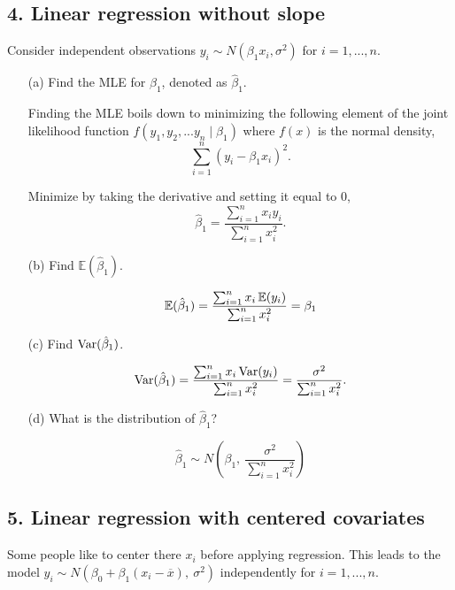 \documentclass{tufte-book}
\begin{document}
\subsection{4. Linear regression without slope} Consider independent observations $y_i \sim N(\beta_1x_i, \sigma^2)$ for $i=1,...,n$.

\begin{enumerate}

\item[(a)] Find the MLE for $\beta_1$, denoted as $\hat{\beta}_1$.

Finding the MLE boils down to minimizing the following element of the joint likelihood function $f(y_1,y_2,...y_n\mid \beta_1)$ where $f(x)$ is the normal density,
\[ \sum_{i=1}^n(y_i-\beta_1x_i)^2. \]

Minimize by taking the derivative and setting it equal to $0$,
\[ \hat{\beta}_1 = \frac{\sum_{i=1}^n x_iy_i}{\sum_{i=1}^nx_i^2}. \]

\item[(b)] Find $\mathbb{E}(\hat{\beta}_1)$.

\[ \operatorname{\mathbb{E}}(\hat{\beta}_1) = \frac{\sum_{i=1}^n x_i\operatorname{\mathbb{E}}(y_i)}{\sum_{i=1}^nx_i^2} = \beta_1 \]

\item[(c)] Find $\operatorname{Var}(\hat{\beta}_1)$.

\[ \operatorname{Var}(\hat{\beta}_1) = \frac{\sum_{i=1}^n x_i\operatorname{Var}(y_i)}{\sum_{i=1}^nx_i^2}= \frac{\sigma^2}{\sum_{i=1}^nx_i^2} .\]

\item[(d)] What is the distribution of $\hat{\beta}_1$?

\[ \hat{\beta}_1 \sim N(\beta_1, \ \frac{\sigma^2}{\sum_{i=1}^nx_i^2}) \]

\end{enumerate}

\subsection{5. Linear regression with centered covariates} Some people like to center there $x_i$ before applying regression.  This leads to the model $y_i \sim N(\beta_0 + \beta_1(x_i-\overline{x}), \ \sigma^2)$ independently for $i=1,...,n$.
\end{document}
